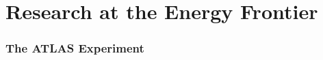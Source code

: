 \documentclass[11pt]{article}
\def\overhead#1{\part{#1}}
\def\onehead#1{\section{#1}}
\begin{document}
\pagestyle{empty}
\baselineskip=23pt
\normalsize

\noindent



\newpage



\newpage

\newpage
\pagestyle{plain}
\setcounter{page}{1}





\newpage


\overhead{Research at the Energy Frontier}
















\onehead{The ATLAS Experiment}


\end{document}
